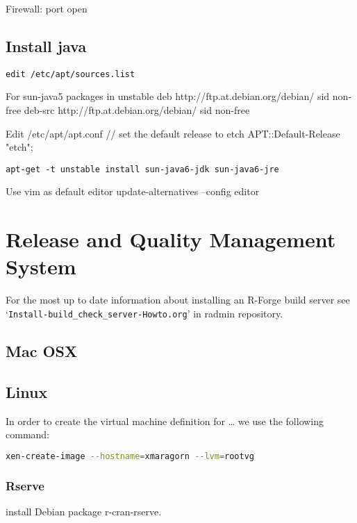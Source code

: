 \documentclass[a4paper]{article}
\let\code=\texttt
\newcommand{\pkg}[1]{{\normalfont\fontseries{b}\selectfont #1}}
\newcommand{\class}[1]{`\code{#1}'}
\let\file=\class
\begin{document}
Firewall: port open

\subsection{Install java}

\begin{lstlisting}[frame=single, framerule=0.95pt]
edit /etc/apt/sources.list
\end{lstlisting}

For sun-java5 packages in unstable
deb http://ftp.at.debian.org/debian/ sid non-free
deb-src http://ftp.at.debian.org/debian/ sid non-free

Edit /etc/apt/apt.conf
// set the default release to etch
APT::Default-Release "etch";

\begin{lstlisting}[frame=single, framerule=0.95pt]
apt-get -t unstable install sun-java6-jdk sun-java6-jre
\end{lstlisting}

Use vim as default editor
update-alternatives --config editor


\section{Release and Quality Management System}
\label{sec:release_and_QM}

For the most up to date information about installing an R-Forge build
server see \file{Install-build\_check\_server-Howto.org} in radmin repository.

\subsection{Mac OSX}
\subsection{Linux}
In order to create the virtual machine definition for \ldots{} we use
the following command:

\begin{lstlisting}[frame=single, framerule=0.95pt, language=bash]
xen-create-image --hostname=xmaragorn --lvm=rootvg
\end{lstlisting}

\subsubsection{Rserve}
install Debian package \pkg{r-cran-rserve}.
\end{document}
